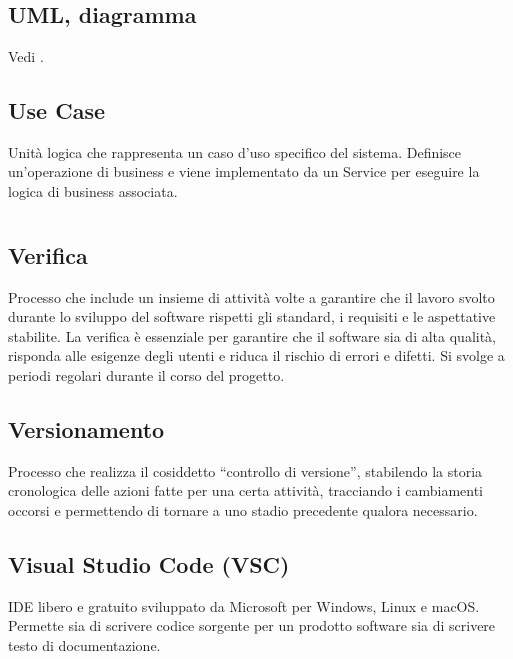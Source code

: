 \newpage



\section{}

\hypertarget{sec:uml}{}
\subsection*{UML, diagramma}
Vedi .

\hypertarget{sec:use case}{}
\subsection*{Use Case}
Unità logica che rappresenta un caso d’uso specifico del sistema. Definisce un’operazione di business e viene implementato da un Service per eseguire la logica di business associata.

\newpage



\section{}

\hypertarget{sec:verifica}{}
\subsection*{Verifica}
Processo che include un insieme di attività volte a garantire che il lavoro svolto durante lo sviluppo del software rispetti gli standard, i requisiti e 
le aspettative stabilite. La verifica è essenziale per garantire che il software sia di alta qualità, risponda alle esigenze degli utenti e riduca il 
rischio di errori e difetti. Si svolge a periodi regolari durante il corso del progetto.

\subsection*{Versionamento}
Processo che realizza il cosiddetto “controllo di versione”, stabilendo la storia cronologica delle azioni fatte per una certa attività, tracciando i 
cambiamenti occorsi e permettendo di tornare a uno stadio precedente qualora necessario.

\hypertarget{sec:VSC}{}
\subsection*{Visual Studio Code (VSC)}
IDE libero e gratuito sviluppato da Microsoft per Windows, Linux e macOS. Permette sia di scrivere codice 
sorgente per un prodotto software sia di scrivere testo di documentazione.

\newpage